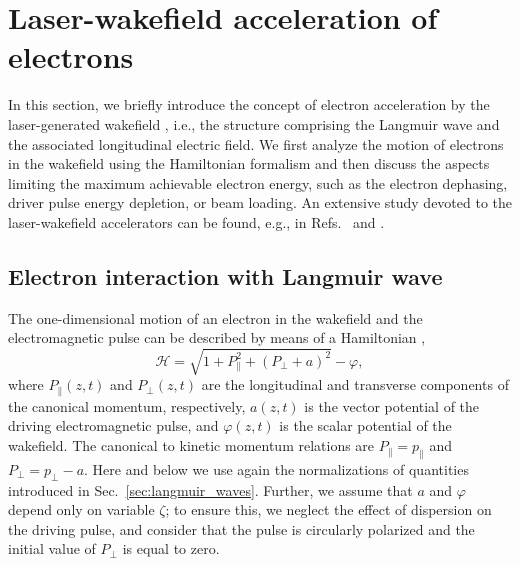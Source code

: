 \documentclass[10pt, a4paper, twoside, openright]{report}
\begin{document}

\section{Laser-wakefield acceleration of electrons\label{sec:lwfa}}
%

In this section, we briefly introduce the concept of electron acceleration by the laser-generated wakefield \cite{Tajima1979}, i.e., the structure comprising the Langmuir wave and the associated longitudinal electric field. We first analyze the motion of electrons in the wakefield using the Hamiltonian formalism and then discuss the aspects limiting the maximum achievable electron energy, such as the electron dephasing, driver pulse energy depletion, or beam loading. An extensive study devoted to the laser-wakefield accelerators can be found, e.g., in Refs.~ and .



\subsection{Electron interaction with Langmuir wave}
%

The one-dimensional motion of an electron in the wakefield and the electromagnetic pulse can be described by means of a Hamiltonian \cite{Esirkepov2006, Esarey2009, Bulanov2013, Bulanov2016},
\begin{equation}\label{eq:hamiltonian}
\mathcal{H} = \sqrt{1 + P_{\parallel}^2 + \left( P_{\bot} + a \right)^2} - \varphi,
\end{equation}
where $ P_{\parallel} \left( z, t \right) $ and $ P_{\bot} \left( z, t \right) $ are the longitudinal and transverse components of the canonical momentum, respectively, $ a \left( z, t \right) $ is the vector potential of the driving electromagnetic pulse, and $ \varphi \left( z, t \right) $ is the scalar potential of the wakefield. The canonical to kinetic momentum relations are $ P_{\parallel} = p_{\parallel} $ and $ P_{\bot} = p_{\bot} - a $. Here and below we use again the normalizations of quantities introduced in Sec.~\ref{sec:langmuir_waves}. Further, we assume that $ a $ and $ \varphi $ depend only on variable $ \zeta $; to ensure this, we neglect the effect of dispersion on the driving pulse, and consider that the pulse is circularly polarized and the initial value of $ P_{\bot} $ is equal to zero.
\end{document}
